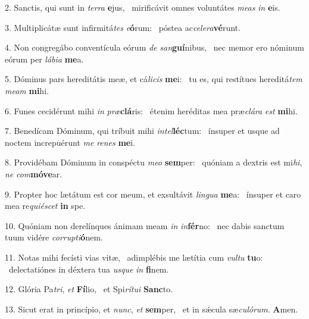2. Sanctis, qui sunt in \textit{ter}\textit{ra} \textbf{e}jus, \ast\  mirificávit omnes voluntátes \textit{me}\textit{as} \textit{in} \textbf{e}is.\

3. Multiplicátæ sunt infirmitá\textit{tes} \textit{e}\textbf{ó}rum: \ast\  póstea ac\textit{ce}\textit{le}\textit{ra}\textbf{vé}runt.\

4. Non congregábo conventícula eórum \textit{de} \textit{san}\textbf{guí}nibus, \ast\  nec memor ero nóminum eórum per \textit{lá}\textit{bi}\textit{a} \textbf{me}a.\

5. Dóminus pars hereditátis meæ, et cá\textit{li}\textit{cis} \textbf{me}i: \ast\  tu es, qui restítues hereditá\textit{tem} \textit{me}\textit{am} \textbf{mi}hi.\

6. Funes cecidérunt mihi \textit{in} \textit{præ}\textbf{clá}ris: \ast\  étenim heréditas mea præ\textit{clá}\textit{ra} \textit{est} \textbf{mi}hi.\

7. Benedícam Dóminum, qui tríbuit mihi \textit{in}\textit{tel}\textbf{léc}tum: \ast\  ínsuper et usque ad noctem increpuérunt \textit{me} \textit{re}\textit{nes} \textbf{me}i.\

8. Providébam Dóminum in conspéctu \textit{me}\textit{o} \textbf{sem}per: \ast\  quóniam a dextris est mi\textit{hi}, \textit{ne} \textit{com}\textbf{mó}\textbf{ve}ar.\

9. Propter hoc lætátum est cor meum, et exsultávit \textit{lin}\textit{gua} \textbf{me}a: \ast\  ínsuper et caro mea re\textit{qui}\textit{é}\textit{scet} \textbf{in} spe.\

10. Quóniam non derelínques ánimam meam \textit{in} \textit{in}\textbf{fér}no: \ast\  nec dabis sanctum tuum vidére \textit{cor}\textit{rup}\textit{ti}\textbf{ó}nem.\

11. Notas mihi fecísti vias vitæ, \dag\  adimplébis me lætítia cum \textit{vul}\textit{tu} \textbf{tu}o: \ast\  delectatiónes in déxtera tua \textit{us}\textit{que} \textit{in} \textbf{fi}nem.\

12. Glória Pa\textit{tri}, \textit{et} \textbf{Fí}lio, \ast\  et Spi\textit{rí}\textit{tu}\textit{i} \textbf{Sanc}to.\

13. Sicut erat in princípio, et \textit{nunc}, \textit{et} \textbf{sem}per, \ast\  et in sǽcula sæ\textit{cu}\textit{ló}\textit{rum}. \textbf{A}men.\

